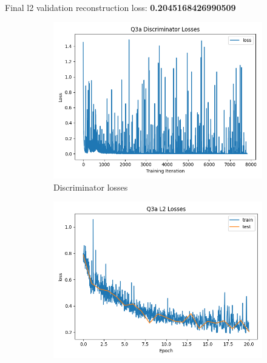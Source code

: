 \documentclass{article}
\begin{document}
\newpage
{}\\

Final l2 validation reconstruction loss: \textbf{0.2045168426990509} \\
\begin{figure}[H]
    \centering
    \begin{subfigure}{0.45\textwidth}
        \centering
        \includegraphics[width=\textwidth]{figures/q3a_gan_losses.png}
        \caption{Discriminator losses}
    \end{subfigure}
    \begin{subfigure}{0.45\textwidth}
        \centering
        \includegraphics[width=\textwidth]{figures/q3a_l2_losses.png}

\end{subfigure}
\end{figure}
\end{document}
